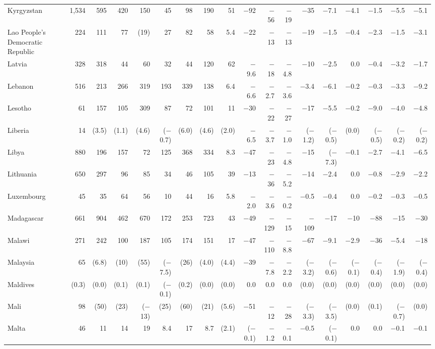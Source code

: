 \begin{longtable}{lrrrrrrrrrrrrrrrrr}
Kyrgyzstan & 1,534 & 595 & 420 & 150 & 45 & 98 & 190 & 51 & $-$92 & $-$56 & $-$19 & $-$35 & $-$7.1 & $-$4.1 & $-$1.5 & $-$5.5 & $-$5.1 \\
Lao People's Democratic Republic & 224 & 111 & 77 & (19) & 27 & 82 & 58 & 5.4 & $-$22 & $-$13 & $-$13 & $-$19 & $-$1.5 & $-$0.4 & $-$2.3 & $-$1.5 & $-$3.1 \\
Latvia & 328 & 318 & 44 & 60 & 32 & 44 & 120 & 62 & $-$9.6 & $-$18 & $-$4.8 & $-$10 & $-$2.5 & 0.0 & $-$0.4 & $-$3.2 & $-$1.7 \\
Lebanon & 516 & 213 & 266 & 319 & 193 & 339 & 138 & 6.4 & $-$6.6 & $-$2.7 & $-$3.6 & $-$3.4 & $-$6.1 & $-$0.2 & $-$0.3 & $-$3.3 & $-$9.2 \\
Lesotho & 61 & 157 & 105 & 309 & 87 & 72 & 101 & 11 & $-$30 & $-$22 & $-$27 & $-$17 & $-$5.5 & $-$0.2 & $-$9.0 & $-$4.0 & $-$4.8 \\
Liberia & 14 & (3.5) & (1.1) & (4.6) & ($-$0.7) & (6.0) & (4.6) & (2.0) & $-$6.5 & $-$3.7 & $-$1.0 & ($-$1.2) & ($-$0.5) & (0.0) & ($-$0.5) & ($-$0.2) & ($-$0.2) \\
Libya & 880 & 196 & 157 & 72 & 125 & 368 & 334 & 8.3 & $-$47 & $-$23 & $-$4.8 & $-$15 & ($-$7.3) & $-$0.1 & $-$2.7 & $-$4.1 & $-$6.5 \\
Lithuania & 650 & 297 & 96 & 85 & 34 & 46 & 105 & 39 & $-$13 & $-$36 & $-$5.2 & $-$14 & $-$2.4 & 0.0 & $-$0.8 & $-$2.9 & $-$2.2 \\
Luxembourg & 45 & 35 & 64 & 56 & 10 & 44 & 16 & 5.8 & $-$2.0 & $-$3.6 & $-$0.2 & $-$0.5 & $-$0.4 & 0.0 & $-$0.2 & $-$0.3 & $-$0.5 \\
Madagascar & 661 & 904 & 462 & 670 & 172 & 253 & 723 & 43 & $-$49 & $-$129 & $-$15 & $-$109 & $-$17 & $-$10 & $-$88 & $-$15 & $-$30 \\
Malawi & 271 & 242 & 100 & 187 & 105 & 174 & 151 & 17 & $-$47 & $-$110 & $-$8.8 & $-$67 & $-$9.1 & $-$2.9 & $-$36 & $-$5.4 & $-$18 \\
Malaysia & 65 & (6.8) & (10) & (55) & ($-$7.5) & (26) & (4.0) & (4.4) & $-$39 & $-$7.8 & $-$2.2 & ($-$3.2) & ($-$0.6) & ($-$0.1) & ($-$0.4) & ($-$1.9) & ($-$0.4) \\
Maldives & (0.3) & (0.0) & (0.1) & (0.1) & ($-$0.1) & (0.2) & (0.0) & (0.0) & 0.0 & 0.0 & 0.0 & (0.0) & (0.0) & (0.0) & (0.0) & (0.0) & (0.0) \\
Mali & 98 & (50) & (23) & ($-$13) & (25) & (60) & (21) & (5.6) & $-$51 & $-$12 & $-$28 & ($-$3.3) & ($-$3.5) & (0.0) & (0.1) & ($-$0.7) & (0.0) \\
Malta & 46 & 11 & 14 & 19 & 8.4 & 17 & 8.7 & (2.1) & ($-$0.1) & $-$1.2 & $-$0.1 & $-$0.5 & ($-$0.1) & 0.0 & 0.0 & $-$0.1 & $-$0.1 \\

\end{longtable}
